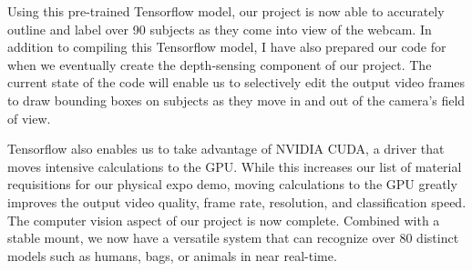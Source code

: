 \documentclass[onecolumn, draftclsnofoot,10pt, compsoc]{IEEEtran}
\begin{document}
\begin{singlespace}
			Using this pre-trained Tensorflow model, our project is now able to accurately outline and label over 90 subjects as they come into view of the webcam.
			In addition to compiling this Tensorflow model, I have also prepared our code for when we eventually create the depth-sensing component of our project.
			The current state of the code will enable us to selectively edit the output video frames to draw bounding boxes on subjects as they move in and out of the camera's field of view.


			Tensorflow also enables us to take advantage of NVIDIA CUDA, a driver that moves intensive calculations to the GPU.
			While this increases our list of material requisitions for our physical expo demo, moving calculations to the GPU greatly improves the output video quality, frame rate, resolution, and classification speed. \cite{nvidia}
			The computer vision aspect of our project is now complete.
			Combined with a stable mount, we now have a versatile system that can recognize over 80 distinct models such as humans, bags, or animals in near real-time.
			

	\clearpage

\end{singlespace}
\end{document}
